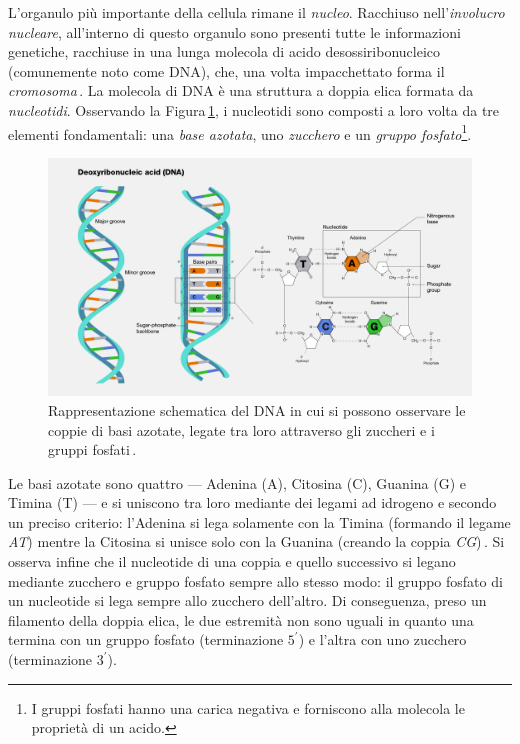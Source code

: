 L'organulo più importante della cellula rimane il \textsl{nucleo}. Racchiuso nell'\textsl{involucro nucleare}, all'interno di questo organulo sono presenti tutte le informazioni genetiche, racchiuse in una lunga molecola di acido desossiribonucleico (comunemente noto come DNA), che, una volta impacchettato forma il \textsl{cromosoma}\,\cite{pollard2022cell, alberts2015essential}. La molecola di DNA è una struttura a doppia elica formata da \textsl{nucleotidi}. Osservando la Figura\,\ref{fig:dna}, i nucleotidi sono composti a loro volta da tre elementi fondamentali: una \textsl{base azotata}, uno \textsl{zucchero} e un \textsl{gruppo fosfato}\footnote{I gruppi fosfati hanno una carica negativa e forniscono alla molecola le proprietà di un acido.}.
% 
\begin{figure}[b!]
    \centering
    \includegraphics[width=\textwidth]{assets/dna2.jpg}
    \caption[Rappresentazione schematica del DNA.]{Rappresentazione schematica del DNA in cui si possono osservare le coppie di basi azotate, legate tra loro attraverso gli zuccheri e i gruppi fosfati\,\cite{nhgri_dna_image}.}\label{fig:dna}
\end{figure}
% 
Le basi azotate sono quattro — Adenina (A), Citosina (C), Guanina (G) e Timina (T) — e si uniscono tra loro mediante dei legami ad idrogeno e secondo un preciso criterio: l'Adenina si lega solamente con la Timina (formando il legame \textit{AT}) mentre la Citosina si unisce solo con la Guanina (creando la coppia \textit{CG})\,\cite{fonseca2000hydrogen, sahu2011identification}. Si osserva infine che il nucleotide di una coppia e quello successivo si legano mediante zucchero e gruppo fosfato sempre allo stesso modo: il gruppo fosfato di un nucleotide si lega sempre allo zucchero dell'altro. Di conseguenza, preso un filamento della doppia elica, le due estremità non sono uguali in quanto una termina con un gruppo fosfato (terminazione $5^\prime$) e l'altra con uno zucchero (terminazione $3^\prime$).

